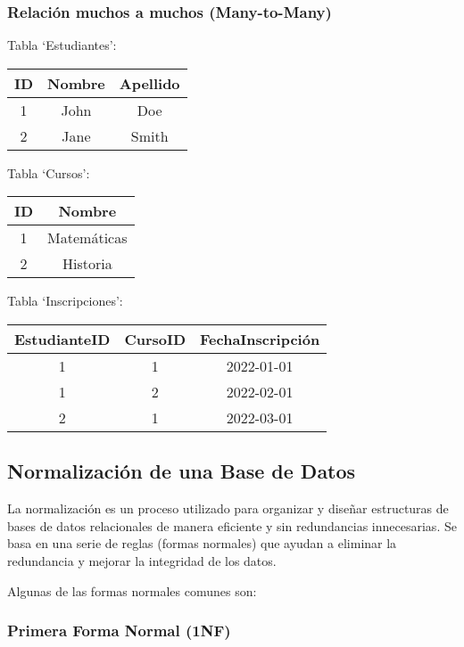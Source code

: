 \documentclass[executivepaper]{article}
\begin{document}
\subsubsection*{Relación muchos a muchos (Many-to-Many)}
Tabla \enquote*{Estudiantes}:
\begin{center}
\begin{tabular}{|c|c|c|}
\hline
\textbf{ID} & \textbf{Nombre} & \textbf{Apellido} \\
\hline
1 & John & Doe \\
\hline
2 & Jane & Smith \\
\hline
\end{tabular}
\end{center}

Tabla \enquote*{Cursos}:
\begin{center}
\begin{tabular}{|c|c|}
\hline
\textbf{ID} & \textbf{Nombre} \\
\hline
1 & Matemáticas \\
\hline
2 & Historia \\
\hline
\end{tabular}
\end{center}

Tabla \enquote*{Inscripciones}:
\begin{center}
\begin{tabular}{|c|c|c|}
\hline
\textbf{EstudianteID} & \textbf{CursoID} & \textbf{FechaInscripción} \\
\hline
1 & 1 & 2022-01-01 \\
\hline
1 & 2 & 2022-02-01 \\
\hline
2 & 1 & 2022-03-01 \\
\hline
\end{tabular}
\end{center}

\subsection{Normalización de una Base de Datos}

La normalización es un proceso utilizado para organizar y diseñar estructuras de bases de datos relacionales de manera eficiente y sin redundancias innecesarias. Se basa en una serie de reglas (formas normales) que ayudan a eliminar la redundancia y mejorar la integridad de los datos.

Algunas de las formas normales comunes son:

\subsubsection*{Primera Forma Normal (1NF)}
\end{document}
